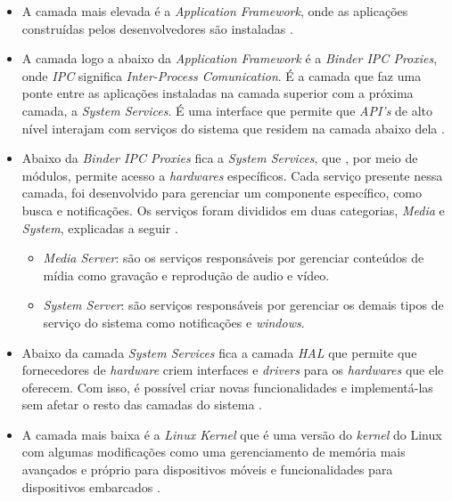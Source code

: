 \begin{itemize}

    \item A camada mais elevada é a \textit{Application Framework}, onde as aplicações construídas pelos desenvolvedores são instaladas \cite{android_android_2016}.
    \item A camada logo a abaixo da \textit{Application Framework} é a \textit{Binder IPC Proxies}, onde \textit{IPC} significa \textit{Inter-Process Comunication}.
    É a camada que faz uma ponte entre as aplicações instaladas na camada superior com a próxima camada, a \textit{System Services}. É uma interface que permite que \textit{API's}
    de alto nível interajam com serviços do sistema que residem na camada abaixo dela \cite{android_android_2016}. 
    \item Abaixo da \textit{Binder IPC Proxies} fica a \textit{System Services}, que , por meio de módulos, permite acesso a \textit{hardwares} específicos. Cada serviço presente nessa camada,
    foi desenvolvido para gerenciar um componente específico, como busca e notificações. Os serviços foram divididos em duas categorias, \textit{Media} e \textit{System}, explicadas a seguir \cite{android_android_2016}.
    \begin{itemize}
        \item \textit{Media Server}: são os serviços responsáveis por gerenciar conteúdos de mídia como gravação e reprodução de audio e vídeo. 
        \item \textit{System Server}: são serviços responsáveis por gerenciar os demais tipos de serviço do sistema como notificações e \textit{windows}.
    \end{itemize}
    \item Abaixo da camada \textit{System Services} fica a camada \textit{HAL} que permite que fornecedores de \textit{hardware} criem interfaces e \textit{drivers} para os \textit{hardwares} que
    ele oferecem. Com isso, é possível criar novas funcionalidades e implementá-las sem afetar o resto das camadas do sistema \cite{android_android_2016}.  
    \item A camada mais baixa é a \textit{Linux Kernel} que é uma versão do \textit{kernel} do Linux com algumas modificações como uma gerenciamento de memória mais avançados e próprio para dispositivos 
    móveis e funcionalidades para dispositivos embarcados \cite{android_android_2016}. 
    
\end{itemize}

